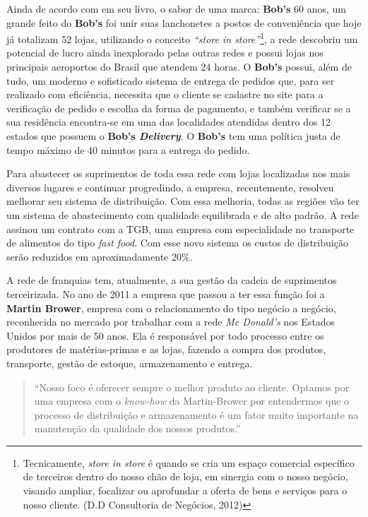 		Ainda de acordo com \cite{lamonica} em seu livro, o sabor de uma marca: \textbf{Bob’s} 60 anos, um grande feito do \textbf{Bob’s} foi unir suas lanchonetes a postos de conveniência que hoje já totalizam 52 lojas, utilizando o conceito \emph{“store in store”}\footnote{Tecnicamente, \emph{store in store} é quando se cria um espaço comercial específico de terceiros dentro do nosso chão de loja, em sinergia com o nosso negócio, visando ampliar, focalizar ou aprofundar a oferta de bens e serviços para o nosso cliente. (D.D Consultoria de Negócios, 2012)}, a rede descobriu um potencial de lucro ainda inexplorado pelas outras redes e possui lojas nos principais aeroportos do Brasil que atendem 24 horas. O \textbf{Bob’s} possui, além de tudo, um moderno e sofisticado sistema de entrega de pedidos que, para ser realizado com eficiência, necessita que o cliente se cadastre no site para a verificação de pedido e escolha da forma de pagamento, e também verificar se a sua residência encontra-se em uma das localidades atendidas dentro dos 12 estados que possuem o \textbf{Bob’s \emph{Delivery}}. O \textbf{Bob’s} tem uma política justa de tempo máximo de 40 minutos para a entrega do pedido.

		Para abastecer os suprimentos de toda essa rede com lojas localizadas nos mais diversos lugares e continuar progredindo, a empresa, recentemente, resolveu melhorar seu sistema de distribuição. Com essa melhoria, todas as regiões vão ter um sistema de abastecimento com qualidade equilibrada e de alto padrão.  A rede assinou um contrato com a TGB, uma empresa com especialidade no transporte de alimentos do tipo \emph{fast food}. Com esse novo sistema os custos de distribuição serão reduzidos em aproximadamente 20\%.

		A rede de franquias tem, atualmente, a sua gestão da cadeia de suprimentos terceirizada. No ano de 2011 a empresa que passou a ter essa função foi a \textbf{Martin Brower}, empresa com o relacionamento do tipo negócio a negócio, reconhecida no mercado por trabalhar com a rede \emph{Mc Donald’s} nos Estados Unidos por mais de 50 anos. Ela é responsável por todo processo entre os produtores de matérias-primas e as lojas, fazendo a compra dos produtos, transporte, gestão de estoque, armazenamento e entrega.

		\begin{quotation}
			“Nosso foco é oferecer sempre o melhor produto ao cliente. Optamos por uma empresa com o \emph{know-how} da Martin-Brower por entendermos que o processo de distribuição e armazenamento é um fator muito importante na manutenção da qualidade dos nossos produtos.” \cite{detsi}
		\end{quotation}
		
